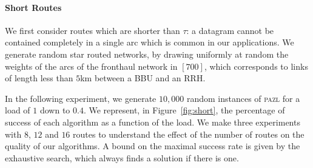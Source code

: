 \documentclass[a4paper,10pt]{journal}
\newcommand\pazl{\textsc{pazl}\xspace}
\begin{document}
    \paragraph{Short Routes}
      
    

 	 We first consider routes which are shorter than $\tau$: a datagram cannot be contained completely in a single arc which is common in our applications. We generate random star routed networks, by drawing uniformly at random the weights of the arcs of the fronthaul network in $[700]$, which corresponds to links of length less than $5$km between a BBU and an RRH.

     In the following experiment, we generate $10,000$ random instances of \pazl for a load of $1$ down to $0.4$. We represent, in Figure~\ref{fig:short}, the percentage of success of each algorithm as a function of the load. We make three experiments with $8$, $12$ and $16$ routes to understand the effect of the number of routes on the quality of our algorithms. A bound on the maximal success rate is given by the exhaustive search, which always finds a solution if there is one. 
       
\end{document}
